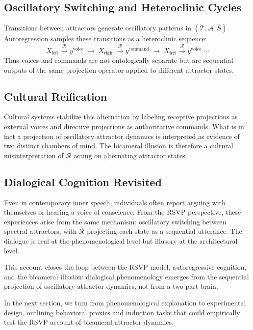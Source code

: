 \documentclass[a4paper,11pt]{article}
\begin{document}
\subsection{Oscillatory Switching and Heteroclinic Cycles}
Transitions between attractors generate oscillatory patterns in $(\mathcal{T},
\mathcal{A}, \bar{S})$. Autoregression samples these transitions as a
heteroclinic sequence:
\begin{equation}
X_{\mathrm{left}} \xrightarrow{\;\mathcal{R}\;} y^{\mathrm{voice}} 
\;\longrightarrow\; 
X_{\mathrm{right}} \xrightarrow{\;\mathcal{R}\;} y^{\mathrm{command}}
\;\longrightarrow\; 
X_{\mathrm{left}} \xrightarrow{\;\mathcal{R}\;} y^{\mathrm{voice}}
\;\cdots
\end{equation}
Thus voices and commands are not ontologically separate but are sequential
outputs of the same projection operator applied to different attractor states.

\subsection{Cultural Reification}
Cultural systems stabilize this alternation by labeling receptive projections as
external voices and directive projections as authoritative commands. What is in
fact a projection of oscillatory attractor dynamics is interpreted as evidence
of two distinct chambers of mind. The bicameral illusion is therefore a
cultural misinterpretation of $\mathcal{R}$ acting on alternating attractor
states.

\subsection{Dialogical Cognition Revisited}
Even in contemporary inner speech, individuals often report arguing with
themselves or hearing a voice of conscience. From the RSVP perspective,
these experiences arise from the same mechanism: oscillatory switching between
spectral attractors, with $\mathcal{R}$ projecting each state as a sequential
utterance. The dialogue is real at the phenomenological level but illusory at
the architectural level.

This account closes the loop between the RSVP model, autoregressive cognition,
and the bicameral illusion: dialogical phenomenology emerges from the sequential
projection of oscillatory attractor dynamics, not from a two-part brain.

In the next section, we turn from phenomenological explanation to experimental design, outlining behavioral proxies and induction tasks that could empirically test the RSVP account of bicameral attractor dynamics.
\end{document}
